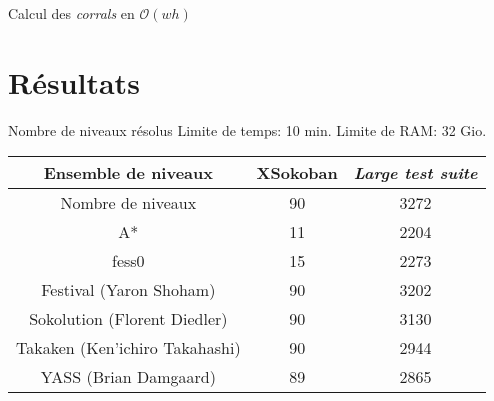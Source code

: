 \begin{frame}{Calcul des \textit{corrals} en $\mathcal{O}(wh)$}
{
            }
        \end{frame}

    \section{Résultats}
        \begin{frame}{Nombre de niveaux résolus}
            \centering
            Limite de temps: 10 min. Limite de RAM: 32 Gio.

            \vspace{0.42cm}
            \begin{tabular}{|c|c|c|}
                \hline
                Ensemble de niveaux            & XSokoban & \textit{Large test suite} \\
                \hline
                Nombre de niveaux              & 90       & 3272 \\
                \hline
                A*                             & 11       & 2204 \\
                \hline
                fess0                          & 15       & 2273 \\
                \hline
                Festival (Yaron Shoham)        & 90       & 3202 \\
                \hline
                Sokolution (Florent Diedler)   & 90       & 3130 \\
                \hline
                Takaken (Ken'ichiro Takahashi) & 90       & 2944 \\
                \hline
                YASS (Brian Damgaard)          & 89       & 2865 \\
                \hline
            \end{tabular}

        \end{frame}

